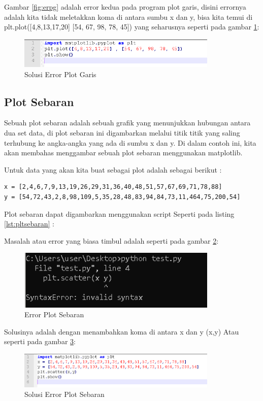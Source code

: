 Gambar \ref{fig:erpg} adalah error kedua pada program plot garis, disini errornya adalah kita tidak meletakkan koma di antara sumbu x dan y, bisa kita temui di 
plt.plot([4,8,13,17,20] [54, 67, 98, 78, 45]) yang seharusnya seperti pada gambar \ref{fig:solpg}:
\begin{figure}[!htbp]
	\centerline{\includegraphics[width=0.85\textwidth]{figures/6/solpg.PNG}}
	\caption{Solusi Error Plot Garis}
	\label{fig:solpg}
\end{figure}       

\subsection{Plot Sebaran}
Sebuah plot sebaran adalah sebuah grafik yang menunjukkan hubungan antara dua set data, di plot sebaran ini digambarkan melalui titik titik yang saling terhubung ke angka-angka yang ada di sumbu x dan y. Di dalam contoh ini, kita akan membahas menggambar sebuah plot sebaran menggunakan matplotlib.

Untuk data yang akan kita buat sebagai plot adalah sebagai berikut : 
\begin{verbatim}
x = [2,4,6,7,9,13,19,26,29,31,36,40,48,51,57,67,69,71,78,88]
y = [54,72,43,2,8,98,109,5,35,28,48,83,94,84,73,11,464,75,200,54]
\end{verbatim}
Plot sebaran dapat digambarkan menggunakan script Seperti pada listing \ref{lst:pltsebaran} : 


Masalah atau error yang biasa timbul adalah seperti pada gambar \ref{fig:errpltsebaran}:
\begin{figure}[!htbp]
	\centerline{\includegraphics[width=0.85\textwidth]{figures/6/errpltsebaran.PNG}}
	\caption{Error Plot Sebaran}
	\label{fig:errpltsebaran}
\end{figure}       

Solusinya adalah dengan menambahkan koma di antara x dan y (x,y)
Atau seperti pada gambar \ref{fig:soleps}:
\begin{figure}[!htbp]
	\centerline{\includegraphics[width=0.85\textwidth]{figures/6/soleps.PNG}}
	\caption{Solusi Error Plot Sebaran}
	\label{fig:soleps}
\end{figure}      

